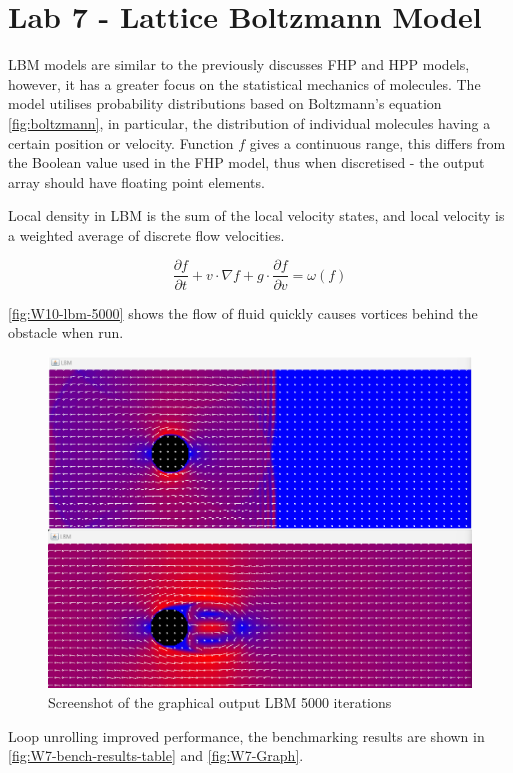 \newpage

\section{Lab 7 - Lattice Boltzmann Model}
LBM models are similar to the previously discusses FHP and HPP models, however, it has a greater focus on the statistical mechanics of molecules. The model utilises probability distributions based on Boltzmann's equation \autoref{fig:boltzmann}, in particular, the distribution of individual molecules having a certain position or velocity. Function $f$ gives a continuous range, this differs from the Boolean value used in the FHP model, thus when discretised - the output array should have floating point elements. 

Local density in LBM is the sum of the local velocity states, and local velocity is a weighted average of discrete flow velocities. 
    \begin{center}
        \begin{equation}
           \frac{\partial f}{\partial t} + v \cdot \nabla f + g \cdot \frac{\partial f}{\partial v} = \omega(f)
            \label{fig:boltzmann}
        \end{equation}  
    \end{center}%

\autoref{fig:W10-lbm-5000} shows the flow of fluid quickly causes vortices behind the obstacle when run. 


\begin{figure}[H] 
    \centering
    \includegraphics[width=0.49\columnwidth]{Figures/Week 7/LBM-Initial-5000-iterations-output.png}
    \caption{Screenshot of the graphical output LBM 5000 iterations}
    \label{fig:W10-lbm-5000}
\end{figure}

Loop unrolling improved performance, the benchmarking results are shown in \autoref{fig:W7-bench-results-table} and \autoref{fig:W7-Graph}.

